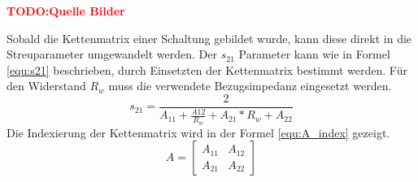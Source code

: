 \textcolor{red}{\textbf{TODO:Quelle Bilder}}

Sobald die Kettenmatrix einer Schaltung gebildet wurde, kann diese direkt in die Streuparameter umgewandelt werden. Der $s_{21}$ Parameter kann wie in Formel \ref{equ:s21} beschrieben, durch Einsetzten der Kettenmatrix bestimmt werden. Für den Widerstand $R_w$ muss die verwendete Bezugsimpedanz eingesetzt werden.
\begin{equation}\label{equ:s21}
s_{21} = \frac{2}{A_{11}+\frac{A{12}}{R_w}+A_{21}*R_w+A_{22}}
\end{equation}
Die Indexierung der Kettenmatrix wird in der Formel \ref{equ:A_index} gezeigt.
\begin{equation}\label{equ:A_index}
	A = \left[\begin{matrix}
	A_{11}&A_{12}\\A_{21}&A_{22}
	\end{matrix}\right]
\end{equation}
\newpage


